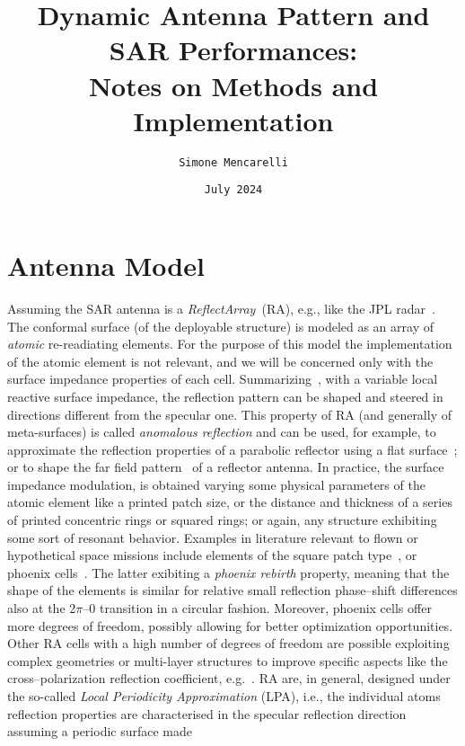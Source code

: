 \documentclass[11pt, a4paper]{scrartcl}
\title{Dynamic Antenna Pattern and SAR Performances: \\Notes on Methods and Implementation}
\author{\texttt{Simone Mencarelli}}
\date{\small{\texttt{July 2024}}}
\begin{document}
    \maketitle


    \section{Antenna Model}
    \label{sec:antenna_model}
    Assuming the SAR antenna is a \emph{ReflectArray}~(RA), e.g., like the JPL radar~\cite{swot}.
    The conformal surface (of the deployable structure) is modeled as an array of \emph{atomic} re-readiating elements.
    For the purpose of this model the implementation of the atomic element is not relevant, and we will be concerned only
    with the surface impedance properties of each cell.
    Summarizing~\cite{MetaTutorialLiu2023}, with a variable local reactive surface impedance, the reflection pattern can
    be shaped and steered in directions different from the specular one.
    This property of RA (and generally of meta-surfaces) is called \emph{anomalous reflection} and can be used, for example, to approximate the reflection properties
    of a parabolic reflector using a flat surface~\cite{rapozar}; or to shape the far field pattern~\cite{Guarrielllo} of a reflector antenna.
    In practice, the surface impedance modulation, is obtained varying some physical parameters of the atomic element
    like a printed patch size, or the distance and thickness of a series of printed concentric rings or squared rings;
    or again, any structure exhibiting some sort of resonant behavior.
    Examples in literature relevant to flown or hypothetical space missions include elements of the square patch
    type~\cite{swot,marco,isara}, or phoenix cells~\cite{Guarrielllo,secondphoenix}.
    The latter exibiting a \emph{phoenix rebirth} property, meaning that the shape of the elements is similar for
    relative small reflection phase--shift differences also at the 2$\pi$--0 transition in a circular fashion.
    Moreover, phoenix cells offer more degrees of freedom, possibly allowing for better optimization opportunities.
    Other RA cells with a high number of degrees of freedom are possible exploiting complex geometries or multi-layer structures
    to improve specific aspects like the cross--polarization reflection coefficient, e.g.~\cite{PradoCrosspolar2017}.
    RA are, in general, designed under the so-called \emph{Local Periodicity Approximation} (LPA), i.e., the individual
    atoms reflection properties are characterised in the specular reflection direction assuming a periodic surface made
\end{document}
